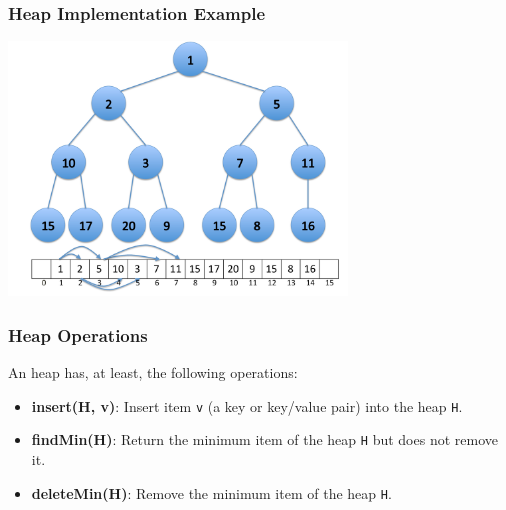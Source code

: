 \documentclass{beamer}
\begin{document}
\begin{frame}[containsverbatim]
\frametitle{Heap Implementation Example}

\begin{center}
\includegraphics[width=9cm]{heap_implementation.pdf}
\end{center}

\end{frame}

\begin{frame}%
\frametitle{Heap Operations}

An heap has, at least, the following operations:
\vspace{0.3cm}
\begin{itemize}

\item<1-> \textbf{insert(H, v)}: Insert item \texttt{v} (a key or key/value pair) into the heap \texttt{H}.

\vspace{0.3cm}

\item<2-> \textbf{findMin(H)}: Return the minimum item of the heap \texttt{H} but does not remove it.

\vspace{0.3cm}

\item<3-> \textbf{deleteMin(H)}: Remove the minimum item of the heap \texttt{H}.
\end{itemize}

\end{frame}
\end{document}
